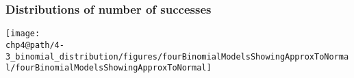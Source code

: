 \documentclass[slidestop,compress,mathserif]{beamer}
\makeatletter
\def\chp4@path{../../Chp 4}
\makeatother
\begin{document}







\begin{frame}
\frametitle{Distributions of number of successes}


\begin{center}
\texttt{[image: \\chp4@path/4-3\_binomial\_distribution/figures/fourBinomialModelsShowingApproxToNormal/fourBinomialModelsShowingApproxToNormal]}
\end{center}

\end{frame}
\end{document}

